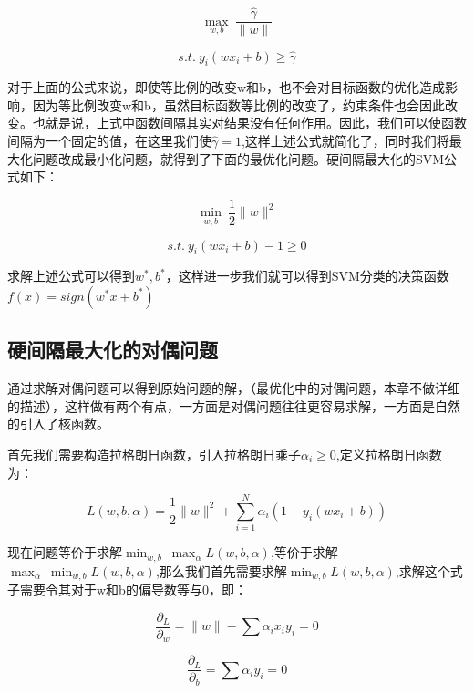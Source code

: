 	\begin{equation}
		\max_{w,b}\ \frac{\hat{\gamma}}{\|w\|}
	\end{equation}
	
	\begin{equation}
		s.t.\ y_i(wx_i+b) \geq \hat{\gamma}
	\end{equation}
	
	对于上面的公式来说，即使等比例的改变w和b，也不会对目标函数的优化造成影响，因为等比例改变w和b，虽然目标函数等比例的改变了，约束条件也会因此改变。也就是说，上式中函数间隔其实对结果没有任何作用。因此，我们可以使函数间隔为一个固定的值，在这里我们使$\hat{\gamma} = 1$,这样上述公式就简化了，同时我们将最大化问题改成最小化问题，就得到了下面的最优化问题。硬间隔最大化的SVM公式如下：
		
	\begin{equation}
		\min_{w,b}\ \frac{1}{2}\|w\|^{2}
	\end{equation}
	
	\begin{equation}
		s.t.\ y_i(wx_i+b) -1 \geq 0
	\end{equation}
	
	求解上述公式可以得到$w^*,b^*$，这样进一步我们就可以得到SVM分类的决策函数$f(x) = sign(w^*x+b^*)$
	
	\subsection{硬间隔最大化的对偶问题}
	通过求解对偶问题可以得到原始问题的解，（最优化中的对偶问题，本章不做详细的描述），这样做有两个有点，一方面是对偶问题往往更容易求解，一方面是自然的引入了核函数。
	
	首先我们需要构造拉格朗日函数，引入拉格朗日乘子$\alpha_i \geq 0$,定义拉格朗日函数为：
	
	\begin{equation}
	L(w,b,\alpha) = \frac{1}{2}\|w\|^2 + \sum_{i=1}^{N}\alpha_i(1-y_i(wx_i+b))
	\end{equation}
	
	现在问题等价于求解$\min_{w,b}\ \max_{\alpha} L(w,b,\alpha)$,等价于求解$\max_{\alpha} \ \min_{w,b} L(w,b,\alpha)$,那么我们首先需要求解$\min_{w,b} L(w,b,\alpha)$,求解这个式子需要令其对于w和b的偏导数等与0，即：
	
	\begin{equation}
		\frac{\partial_L}{\partial_w}=\|w\| - \sum \alpha_i x_i y_i = 0
	\end{equation}

	\begin{equation}
		\frac{\partial_L}{\partial_b}=\sum \alpha_i y_i = 0
	\end{equation}
	

